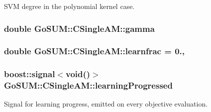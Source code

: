 S\-V\-M degree in the polynomial kernel case. 

\hypertarget{class_go_s_u_m_1_1_c_single_a_m_a78163361ed0edb048f97cd382b9014e5}{
\subsubsection[{gamma}]{\setlength{\rightskip}{0pt plus 5cm}double Go\-S\-U\-M\-::\-C\-Single\-A\-M\-::gamma\hspace{0.3cm}{\ttfamily [protected]}}}\label{class_go_s_u_m_1_1_c_single_a_m_a78163361ed0edb048f97cd382b9014e5}
\hypertarget{class_go_s_u_m_1_1_c_single_a_m_a10aa46c970ec92e30099d2db7cabd645}{
\subsubsection[{learnfrac}]{\setlength{\rightskip}{0pt plus 5cm}double Go\-S\-U\-M\-::\-C\-Single\-A\-M\-::learnfrac = 0.\hspace{0.3cm}{\ttfamily [static]}, {\ttfamily [protected]}}}\label{class_go_s_u_m_1_1_c_single_a_m_a10aa46c970ec92e30099d2db7cabd645}
\hypertarget{class_go_s_u_m_1_1_c_single_a_m_aeb0dea2fcd2ba48e5853c56f1a5b3fe6}{
\subsubsection[{learning\-Progressed}]{\setlength{\rightskip}{0pt plus 5cm}boost\-::signal$<$void()$>$ Go\-S\-U\-M\-::\-C\-Single\-A\-M\-::learning\-Progressed}}\label{class_go_s_u_m_1_1_c_single_a_m_aeb0dea2fcd2ba48e5853c56f1a5b3fe6}


Signal for learning progress, emitted on every objective evaluation. 

